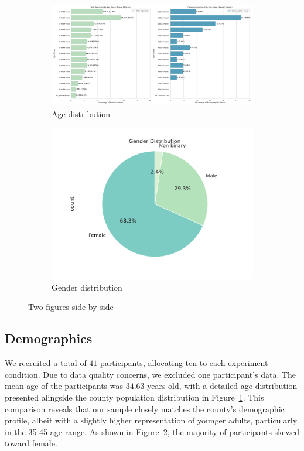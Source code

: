 \begin{figure}[ht]
    \centering
    \begin{subfigure}[b]{0.65\textwidth}
        \centering
        \includegraphics[width=\textwidth]{content/image/demo/demo_age_group.pdf}
        \caption{Age distribution}
        \label{fig:demoAge}
    \end{subfigure}
    \hfill
    \begin{subfigure}[b]{0.3\textwidth}
        \centering
        \includegraphics[width=\textwidth]{content/image/demo/demo_gender.pdf}
        \caption{Gender distribution}
        \label{fig:demoGender}
    \end{subfigure}
    \caption{Two figures side by side}
    \label{fig:Demographics}
\end{figure}


\subsection{Demographics}
We recruited a total of $41$ participants, allocating ten to each experiment condition. Due to data quality concerns, we excluded one participant's data. The mean age of the participants was $34.63$ years old, with a detailed age distribution presented alingside the county population distribution in Figure~\ref{fig:demoAge}. This comparison reveals that our sample closely matches the county's demographic profile, albeit with a slightly higher representation of younger adults, particularly in the 35-45 age range. As shown in Figure~\ref{fig:demoGender}, the majority of participants skewed toward female.

